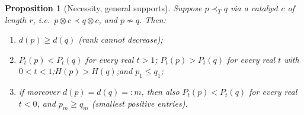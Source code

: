 \documentclass{amsart}
\theoremstyle{plain}
\newtheorem{proposition}{Proposition}
\theoremstyle{definition}
\newcommand{\maj}{\prec}
\newcommand{\trump}{\prec_T}
\begin{document}
\begin{proposition}[Necessity, general supports]\label{prop:nec-gen}
Suppose $p\trump q$ via a catalyst $c$ of length $r$, i.e.\ $p\otimes c\maj q\otimes c$,
and $p\not\sim q$. Then:
\begin{enumerate}
\item[\textnormal{(R)}] $d(p)\ge d(q)$ (rank cannot decrease);
\item[\textnormal{(P+)}] $P_t(p)<P_t(q)$ for every real $t>1$;\quad
      $P_t(p)>P_t(q)$ for every real $t$ with $0<t<1$;\quad $H(p)>H(q)$;\quad and
      $p_1\le q_1$;
\item[\textnormal{(P$-$)}] if moreover $d(p)=d(q)=:m$, then also $P_t(p)<P_t(q)$ for
      every real $t<0$, and $p_m\ge q_m$ (smallest positive entries).
\end{enumerate}
\end{proposition}
\end{document}

